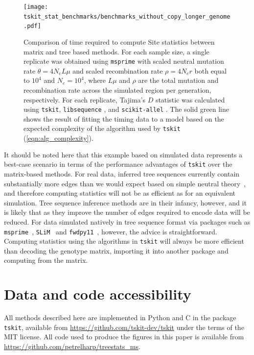 \documentclass{article}
\newcommand{\tskit}{{\texttt{tskit}}}
\begin{document}
\begin{figure}
    \centering
    \texttt{[image: tskit\_stat\_benchmarks/benchmarks\_without\_copy\_longer\_genome.pdf]}
    \caption{Comparison of time required to compute Site statistics
        between matrix and tree based methods. For each sample size, a single replicate
        was obtained using \texttt{msprime} with scaled neutral mutation rate $\theta = 4 N_e L \mu$ and
        scaled recombination rate $\rho = 4N_er$ both equal to $10^4$ and $N_e = 10^4$,
        where $L\mu$ and $\rho$ are the total mutation and recombination rate across the simulated region
        per generation, respectively.
        For each replicate, Tajima's $D$
        \citep{Tajima1989-de} statistic was calculated using \tskit, \texttt{libsequence}
        \citep{Thornton2003-wj}, and \texttt{scikit-allel} \citep{miles2017scikit}.
        The solid green line shows the result of fitting the timing data to a model based on the expected complexity of the algorithm used by \texttt{tskit}
        (\autoref{eqn:alg_complexity}).
        \label{fig:stats_performance}
    }
\end{figure}

It should be noted here that this example based on simulated data
represents a best-case scenario in terms of the performance advantages
of \tskit{} over the matrix-based methods. For real data, inferred
tree sequences currently contain substantially more edges than we
would expect based on simple neutral theory~\citep{kelleher2019inferring},
and therefore computing statistics will not be as efficient as
for an equivalent simulation. Tree sequence inference
methods are in their infancy, however, and it is likely that
as they improve the number of edges required to encode data will
be reduced. For data simulated natively in tree sequence format
via packages such as \texttt{msprime}~\citep{kelleher2016efficient},
\texttt{SLiM}~\citep{haller2018tree,haller2019slim} and
\texttt{fwdpy11}~\citep{thornton2014c++}, however, the advice is straightforward.
Computing statistics using the algorithms in \tskit{}
will always be more efficient than decoding the genotype
matrix, importing it into another package and computing from the matrix.



\section*{Data and code accessibility}

All methods described here are implemented in Python and C in the package \tskit{},
available from \url{https://github.com/tskit-dev/tskit}
under the terms of the MIT license.
All code used to produce the figures in this paper
is available from \url{https://github.com/petrelharp/treestats_ms}.
\end{document}
